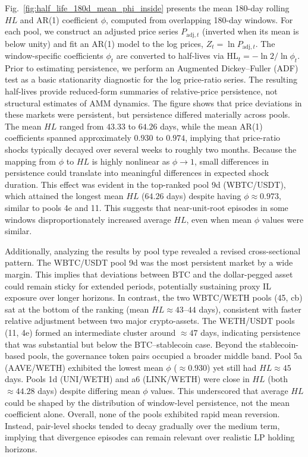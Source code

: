 \documentclass[anonymous]{lipics-v2021}
\begin{document}
{Fig.~\ref{fig:half_life_180d_mean_phi_inside} presents the mean 180-day rolling $HL$ and AR(1) coefficient $\phi$, computed from overlapping 180-day windows. 
For each pool, we construct an adjusted price series $P_{\text{adj},t}$ (inverted when its mean is below unity) and fit an AR(1) model to the log prices, $Z_t=\ln P_{\text{adj},t}$. 
The window-specific coefficients $\phi_t$ are converted to half-lives via $\mathrm{HL}_t=-\ln 2 / \ln \phi_t$.
Prior to estimating persistence, we perform an Augmented Dickey--Fuller (ADF) test as a basic stationarity diagnostic for the log price-ratio series. 
The resulting half-lives provide reduced-form summaries of relative-price persistence, not structural estimates of AMM dynamics.
The figure shows that price deviations in these markets were persistent, but persistence differed materially across pools. 
The mean $HL$ ranged from $43.33$ to $64.26$ days, while the mean AR(1) coefficients spanned approximately $0.930$ to $0.974$, implying that price-ratio shocks typically decayed over several weeks to roughly two months. 
Because the mapping from $\phi$ to $HL$ is highly nonlinear as $\phi\to 1$, small differences in persistence could translate into meaningful differences in expected shock duration.
This effect was evident in the top-ranked pool 9d (WBTC/USDT), which attained the longest mean $HL$ ($64.26$ days) despite having $\phi\approx0.973$, similar to pools 4e and 11. 
This suggests that near-unit-root episodes in some windows disproportionately increased average $HL$, even when mean $\phi$ values were similar.

Additionally, analyzing the results by pool type revealed a revised cross-sectional pattern.
The WBTC/USDT pool 9d was the most persistent market by a wide margin. 
This implies that deviations between BTC and the dollar-pegged asset could remain sticky for extended periods, potentially sustaining proxy IL exposure over longer horizons.
In contrast, the two WBTC/WETH pools (45, cb) sat at the bottom of the ranking (mean $HL\approx 43$--$44$ days), consistent with faster relative adjustment between two major crypto-assets. 
The WETH/USDT pools (11, 4e) formed an intermediate cluster around $\approx 47$ days, indicating persistence that was substantial but below the BTC--stablecoin case. 
Beyond the stablecoin-based pools, the  governance token pairs occupied a broader middle band.
Pool 5a (AAVE/WETH) exhibited the lowest mean $\phi$ ($\approx0.930$) yet still had $HL\approx45$ days. 
Pools 1d (UNI/WETH) and a6 (LINK/WETH) were close in $HL$ (both $\approx44.28$ days) despite differing mean $\phi$ values. 
This underscored that average $HL$ could be shaped by the distribution of window-level persistence, not the mean coefficient alone.
Overall, none of the pools exhibited rapid mean reversion. Instead, pair-level shocks tended to decay gradually over the medium term, implying that divergence episodes can remain relevant over realistic LP holding horizons.


}
\end{document}
